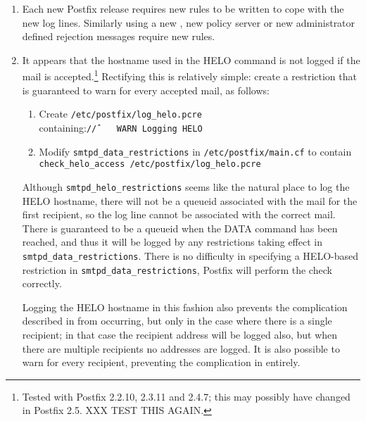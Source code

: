 \begin{enumerate}

    \item Each new Postfix release requires new rules to be written to cope
        with the new log lines.  Similarly using a new \DNSBL{}, new policy
        server or new administrator defined rejection messages require new
        rules.

    \item It appears that the hostname used in the HELO command is not
        logged if the mail is accepted.\footnote{Tested with Postfix
        2.2.10, 2.3.11 and 2.4.7; this may possibly have changed in Postfix
        2.5. XXX TEST THIS AGAIN.}  Rectifying this is relatively simple:
        create a restriction that is guaranteed to warn for every accepted
        mail, as follows:

        \begin{enumerate}

            \item Create \texttt{/etc/postfix/log\_helo.pcre}
                containing:\newline \tab{}\texttt{/\^/~~~~WARN~Logging~HELO}

            \item Modify \texttt{smtpd\_data\_restrictions} in
                \texttt{/etc/postfix/main.cf} to contain\newline
                \tab{}\texttt{check\_helo\_access~/etc/postfix/log\_helo.pcre}

        \end{enumerate}

        Although \texttt{smtpd\_helo\_restrictions} seems like the natural
        place to log the HELO hostname, there will not be a queueid
        associated with the mail for the first recipient, so the log line
        cannot be associated with the correct mail.  There is guaranteed
        to be a queueid when the DATA command has been reached, and thus it
        will be logged by any restrictions taking effect in
        \texttt{smtpd\_data\_restrictions}.  There is no difficulty in
        specifying a HELO-based restriction in
        \texttt{smtpd\_data\_restrictions}, Postfix will perform the check
        correctly.

        Logging the HELO hostname in this fashion also prevents the
        complication described in  from occurring, but only in the case where there is a
        single recipient; in that case the recipient address will be logged
        also, but when there are multiple recipients no addresses are
        logged.  It is also possible to warn for every recipient,
        preventing the complication in  entirely.


\end{enumerate}
